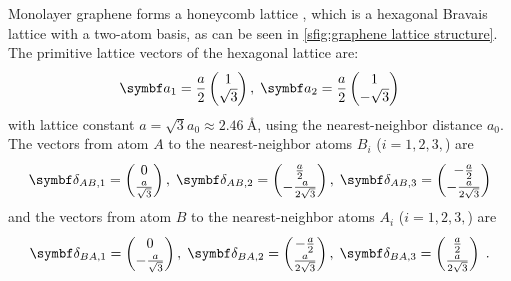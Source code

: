 \documentclass[../main.tex]{subfiles}
\begin{document}
Monolayer graphene forms a honeycomb lattice \cite{yangStructuregrapheneIts2018}, which is a hexagonal Bravais lattice with a two-atom basis, as can be seen in \cref{sfig:graphene lattice structure}.
The primitive lattice vectors of the hexagonal lattice are:
\begin{align}
	\vb{a}_1 = \frac{a}{2} \begin{pmatrix} 1 \\ \sqrt{3} \end{pmatrix}, \; \vb{a}_2 = \frac{a}{2} \begin{pmatrix} 1 \\ -\sqrt{3} \end{pmatrix}
\end{align}
with lattice constant \(a = \sqrt{3} a_0 \approx \SI{2.46}{\angstrom}\), using the nearest-neighbor distance \(a_0\).
The vectors from atom \(A\) to the nearest-neighbor atoms \(B_i\) (\(i = 1, 2, 3,\)) are
\begin{align}
	\vb{\delta}_{AB, 1} = \begin{pmatrix} 0 \\ \frac{a}{\sqrt{3}} \end{pmatrix},\; \vb{\delta}_{AB, 2} = \begin{pmatrix} \frac{a}{2} \\ -\frac{a}{2\sqrt{3}} \end{pmatrix},\; \vb{\delta}_{AB, 3} = \begin{pmatrix} -\frac{a}{2} \\ -\frac{a}{2\sqrt{3}} \end{pmatrix}
\end{align}
and the vectors from atom \(B\) to the nearest-neighbor atoms \(A_i\) (\(i = 1, 2, 3,\)) are
\begin{align}
	\vb{\delta}_{BA, 1} = \begin{pmatrix} 0 \\ -\frac{a}{\sqrt{3}} \end{pmatrix},\; \vb{\delta}_{BA, 2} = \begin{pmatrix} -\frac{a}{2} \\ \frac{a}{2\sqrt{3}} \end{pmatrix},\; \vb{\delta}_{BA, 3} = \begin{pmatrix} \frac{a}{2} \\ \frac{a}{2\sqrt{3}} \end{pmatrix} \;.
\end{align}
\end{document}
